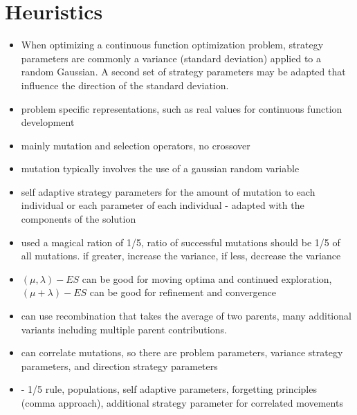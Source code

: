 \documentclass[a4paper, 11pt]{article}
\begin{document}
\section{Heuristics}
\label{sec:heuristics}
\begin{itemize}
	\item When optimizing a continuous function optimization problem, strategy parameters are commonly a variance (standard deviation) applied to a random Gaussian. A second set of strategy parameters may be adapted that influence the direction of the standard deviation.
	
	
	\item problem specific representations, such as real values for continuous function development
	\item mainly mutation and selection operators, no crossover
	\item mutation typically involves the use of a gaussian random variable 
	\item self adaptive strategy parameters for the amount of mutation to each individual or each parameter of each individual - adapted with the components of the solution
	\item used a magical ration of 1/5, ratio of successful mutations should be 1/5 of all mutations. if greater, increase the variance, if less, decrease the variance
	\item $(\mu,\lambda)-ES$ can be good for moving optima and continued exploration, $(\mu + \lambda)-ES$ can be good for refinement and convergence
	\item can use recombination that takes the average of two parents, many additional variants including multiple parent contributions.
	\item can correlate mutations, so there are problem parameters, variance strategy parameters, and direction strategy parameters
	\item - 1/5 rule, populations, self adaptive parameters, forgetting principles (comma approach), additional strategy parameter for correlated movements
	
\end{itemize}

\end{document}
